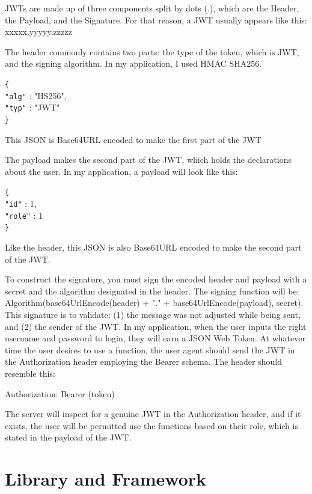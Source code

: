 \documentclass[a4paper, 11pt,openany]{book} %
\begin{document}
JWTs are made up of three components split by dots (.), which are the Header, the Payload, and the Signature. For that reason, a JWT usually appears like this: xxxxx.yyyyy.zzzzz\par

The header commonly contains two parts: the type of the token, which is JWT, and the signing algorithm. In my application, I used HMAC SHA256.
\begin{tabbing}
\verb|{| \\
\quad \verb|"alg"| : "HS256", \\
\quad  \verb|"typ"| : "JWT" \\
\verb|}|
\end{tabbing}
This JSON is Base64URL encoded to make the first part of the JWT\par
The payload makes the second part of the JWT, which holds the declarations about the user.
In my application, a payload will look like this:
\begin{tabbing}
\verb|{| \\
\quad \verb|"id"| : 1, \\
\quad  \verb|"role"| : 1 \\
\verb|}|
\end{tabbing}
Like the header, this JSON is also Base64URL encoded to make the second part of the JWT.\par
To construct the signature, you must sign the encoded header and payload with a secret and the algorithm designated in the header. The signing function will be: Algorithm(base64UrlEncode(header) + "." + base64UrlEncode(payload), secret). This signature is to validate: (1) the message was not adjusted while being sent, and (2) the sender of the JWT.
In my application, when the user inputs the right username and password to login, they will earn a JSON Web Token. At whatever time the user desires to use a function, the user agent should send the JWT in the Authorization header employing the Bearer schema. The header should resemble this:\par
Authorization: Bearer (token)\par
The server will inspect for a genuine JWT in the Authorization header, and if it exists, the user will be permitted use the functions based on their role, which is stated in the payload of the JWT.\cite{jwt}

\section{Library and Framework}
\end{document}
